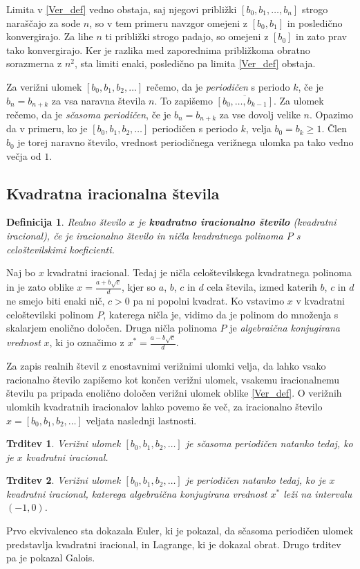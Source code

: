 \documentclass[a4paper,12pt]{article}
\newtheorem{trditev}{Trditev}
\newtheorem{definicija}{Definicija}
\begin{document}
Limita v \eqref{Ver_def} vedno obstaja, saj njegovi približki $[b_0, b_1, \ldots, b_n]$ strogo naraščajo za sode $n$, so v tem primeru navzgor omejeni z $[b_0, b_1]$ in posledično konvergirajo. Za lihe $n$ ti približki strogo padajo, so omejeni z $[b_0]$ in zato prav tako konvergirajo. Ker je razlika med zaporednima približkoma obratno sorazmerna z $n^2$, sta limiti enaki, posledično pa limita \eqref{Ver_def} obstaja. 

Za verižni ulomek $[b_0, b_1, b_2, \ldots]$ rečemo, da je \emph{periodičen} s periodo $k$, če je $b_n = b_{n+k}$ za vsa naravna števila $n$. To zapišemo $\overline{[b_0, \ldots, b_{k-1}]}$.
Za ulomek rečemo, da je \emph{sčasoma periodičen}, če je $b_n = b_{n+k}$ za vse dovolj velike $n$. Opazimo da v primeru, ko je $[b_0, b_1, b_2, \ldots]$ periodičen s periodo $k$, velja $b_0 = b_k \geq 1$. Člen $b_0$ je torej naravno število, vrednost periodičnega verižnega ulomka pa tako vedno večja od $1$. 


\subsection{Kvadratna iracionalna števila}

\begin{definicija}
	Realno število $x$ je \textbf{kvadratno iracionalno število} (kvadratni iracional), če je iracionalno število in ničla kvadratnega polinoma $P$ s celoštevilskimi koeficienti.
\end{definicija}
Naj bo $x$ kvadratni iracional. Tedaj je ničla celoštevilskega kvadratnega polinoma in je zato oblike $x = \frac{a + b\sqrt{c}}{d}$, kjer so $a$, $b$, $c$ in $d$ cela števila, izmed katerih $b$, $c$ in $d$ ne smejo biti enaki nič, $c > 0$ pa ni popolni kvadrat. Ko vstavimo $x$ v kvadratni celoštevilski polinom $P$, katerega ničla je, vidimo da je polinom do množenja s skalarjem enolično določen.
Druga ničla polinoma $P$ je \emph{algebraična konjugirana vrednost} $x$, ki jo označimo z $x^* = \frac{a - b\sqrt{c}}{d}$.

Za zapis realnih števil z enostavnimi verižnimi ulomki velja, da lahko vsako racionalno število zapišemo kot končen verižni ulomek, vsakemu iracionalnemu številu pa pripada enolično določen verižni ulomek oblike \eqref{Ver_def}. O verižnih ulomkih kvadratnih iracionalov lahko povemo še več, za iracionalno število $x = [b_0, b_1, b_2, \ldots]$ veljata naslednji lastnosti.
\begin{trditev}
    Verižni ulomek $[b_0, b_1, b_2, \ldots]$ je sčasoma periodičen natanko tedaj, ko je $x$ kvadratni iracional.
\end{trditev}
\begin{trditev}
    Verižni ulomek $[b_0, b_1, b_2, \ldots]$ je periodičen natanko tedaj, ko je $x$ kvadratni iracional, katerega algebraična konjugirana vrednost $x^*$ leži na intervalu $(-1, 0)$.
\end{trditev} 
Prvo ekvivalenco sta dokazala Euler, ki je pokazal, da sčasoma periodičen ulomek predstavlja kvadratni iracional, in Lagrange, ki je dokazal obrat. Drugo trditev pa je pokazal Galois.
\end{document}
